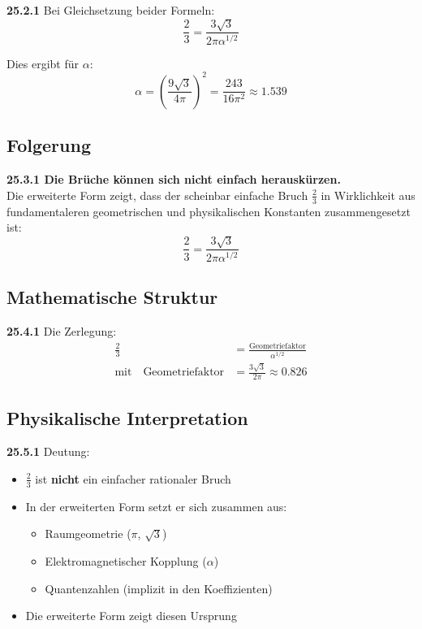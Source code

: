\noindent \textbf{25.2.1} Bei Gleichsetzung beider Formeln:
\[
\frac{2}{3} = \frac{3\sqrt{3}}{2\pi\alpha^{1/2}}
\]

Dies ergibt für $\alpha$:
\[
\alpha = \left(\frac{9\sqrt{3}}{4\pi}\right)^2 = \frac{243}{16\pi^2} \approx 1.539
\]

\subsection{Folgerung}

\begin{tcolorbox}[colback=red!5!white,colframe=red!75!black]
	\textbf{25.3.1 Die Brüche können sich nicht einfach herauskürzen.}
	\\
	Die erweiterte Form zeigt, dass der scheinbar einfache Bruch $\frac{2}{3}$ in Wirklichkeit aus fundamentaleren geometrischen und physikalischen Konstanten zusammengesetzt ist:
	\[
	\frac{2}{3} = \frac{3\sqrt{3}}{2\pi\alpha^{1/2}}
	\]
\end{tcolorbox}

\subsection{Mathematische Struktur}

\noindent \textbf{25.4.1} Die Zerlegung:
\begin{align*}
	\frac{2}{3} &= \frac{\text{Geometriefaktor}}{\alpha^{1/2}} \\
	\text{mit} \quad \text{Geometriefaktor} &= \frac{3\sqrt{3}}{2\pi} \approx 0.826
\end{align*}

\subsection{Physikalische Interpretation}

\noindent \textbf{25.5.1} Deutung:
\begin{itemize}
	\item $\frac{2}{3}$ ist \textbf{nicht} ein einfacher rationaler Bruch
	\item In der erweiterten Form setzt er sich zusammen aus:
	\begin{itemize}
		\item Raumgeometrie ($\pi$, $\sqrt{3}$)
		\item Elektromagnetischer Kopplung ($\alpha$)
		\item Quantenzahlen (implizit in den Koeffizienten)
	\end{itemize}
	\item Die erweiterte Form zeigt diesen Ursprung
\end{itemize}

